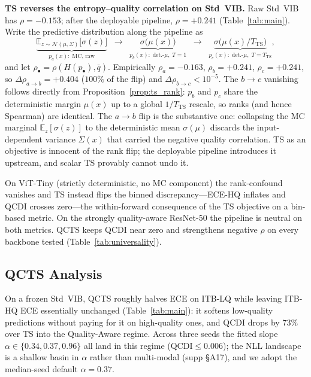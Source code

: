 \documentclass{bmvc2k}
\newcommand{\E}{\mathbb{E}}
\begin{document}
\textbf{TS reverses the entropy--quality correlation on Std~VIB.}
Raw Std~VIB has $\rho{=}-0.153$; after the deployable pipeline, $\rho{=}+0.241$ (Table~\ref{tab:main}). Write the predictive distribution along the pipeline as
\begin{equation}
\underbrace{\E_{z\sim\mathcal{N}(\mu,\Sigma)}\!\big[\sigma(z)\big]}_{p_a(x):\;\text{MC, raw}}
\;\;\to\;\;
\underbrace{\sigma\!\big(\mu(x)\big)}_{p_b(x):\;\text{det.-}\mu,\;T{=}1}
\;\;\to\;\;
\underbrace{\sigma\!\big(\mu(x)/T_\mathrm{TS}\big)}_{p_c(x):\;\text{det.-}\mu,\;T{=}T_\mathrm{TS}},
\label{eq:pipeline}
\end{equation}
and let $\rho_\bullet{=}\rho(H(p_\bullet),\bar q)$. Empirically $\rho_a{=}{-}0.163$, $\rho_b{=}{+}0.241$, $\rho_c{=}{+}0.241$, so $\Delta\rho_{a\to b}{=}{+}0.404$ ($100\%$ of the flip) and $\Delta\rho_{b\to c}{<}10^{-5}$. The $b{\to}c$ vanishing follows directly from Proposition~\ref{prop:ts_rank}: $p_b$ and $p_c$ share the deterministic margin $\mu(x)$ up to a global $1/T_\mathrm{TS}$ rescale, so ranks (and hence Spearman) are identical. The $a{\to}b$ flip is the substantive one: collapsing the MC marginal $\E_z[\sigma(z)]$ to the deterministic mean $\sigma(\mu)$ discards the input-dependent variance $\Sigma(x)$ that carried the negative quality correlation. TS as an objective is innocent of the rank flip; the deployable pipeline introduces it upstream, and scalar TS provably cannot undo it.

On ViT-Tiny (strictly deterministic, no MC component) the rank-confound vanishes and TS instead flips the binned discrepancy---ECE-HQ inflates and QCDI crosses zero---the within-forward consequence of the TS objective on a bin-based metric. On the strongly quality-aware ResNet-50 the pipeline is neutral on both metrics. QCTS keeps QCDI near zero and strengthens negative $\rho$ on every backbone tested (Table~\ref{tab:universality}).



\subsection{QCTS Analysis}
\label{sec:qcts_analysis}

On a frozen Std~VIB, QCTS roughly halves ECE on ITB-LQ while leaving ITB-HQ ECE essentially unchanged (Table~\ref{tab:main}): it softens low-quality predictions without paying for it on high-quality ones, and QCDI drops by $73\%$ over TS into the Quality-Aware regime. Across three seeds the fitted slope $\alpha\in\{0.34, 0.37, 0.96\}$ all land in this regime (QCDI${\le}0.006$); the NLL landscape is a shallow basin in $\alpha$ rather than multi-modal (supp \S A17), and we adopt the median-seed default $\alpha{=}0.37$.
\end{document}
